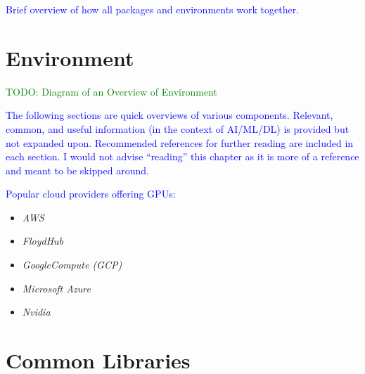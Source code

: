 

\textcolor{blue}{Brief overview of how all packages and environments work together.}

\chapter{Environment}

\textcolor{green}{TODO: Diagram of an Overview of Environment}

\textcolor{blue}{The following sections are quick overviews of various components. Relevant, common, and useful information (in the context of AI/ML/DL) is provided but not expanded upon. Recommended references for further reading are included in each section. I would not advise ``reading'' this chapter as it is more of a reference and meant to be skipped around.}


\textcolor{blue}{Popular cloud providers offering GPUs:}

\begin{itemize}
	\item \emph{AWS}~\cite{cloudHW_amazon_aws}
	\item \emph{FloydHub}~\cite{cloudHW_floydhub}
	\item \emph{GoogleCompute (GCP)}~\cite{cloudHW_google_cloud}
	\item \emph{Microsoft Azure}~\cite{cloudHW_micro_azure} 
	\item \emph{Nvidia}~\cite{cloudHW_nvidia_cloud}
\end{itemize}

\chapter{Common Libraries}


